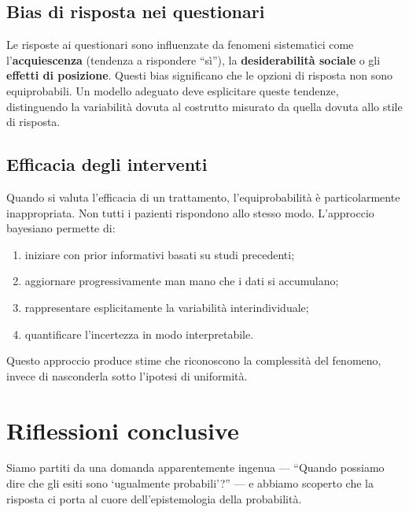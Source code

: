 \documentclass[
  italian,
  letterpaper,
  a4paper,
  11pt,
  open=any]{scrbook}
\providecommand{\tightlist}{%
  \setlength{\itemsep}{0pt}\setlength{\parskip}{0pt}}
\theoremstyle{plain}
\theoremstyle{definition}
\theoremstyle{definition}
\theoremstyle{remark}
\begin{document}
\subsection{Bias di risposta nei
questionari}\label{bias-di-risposta-nei-questionari}

Le risposte ai questionari sono influenzate da fenomeni sistematici come
l'\textbf{acquiescenza} (tendenza a rispondere ``sì''), la
\textbf{desiderabilità sociale} o gli \textbf{effetti di posizione}.
Questi bias significano che le opzioni di risposta non sono
equiprobabili. Un modello adeguato deve esplicitare queste tendenze,
distinguendo la variabilità dovuta al costrutto misurato da quella
dovuta allo stile di risposta.

\subsection{Efficacia degli
interventi}\label{efficacia-degli-interventi}

Quando si valuta l'efficacia di un trattamento, l'equiprobabilità è
particolarmente inappropriata. Non tutti i pazienti rispondono allo
stesso modo. L'approccio bayesiano permette di:

\begin{enumerate}
\def\labelenumi{\arabic{enumi}.}
\tightlist
\item
  iniziare con prior informativi basati su studi precedenti;
\item
  aggiornare progressivamente man mano che i dati si accumulano;
\item
  rappresentare esplicitamente la variabilità interindividuale;
\item
  quantificare l'incertezza in modo interpretabile.
\end{enumerate}

Questo approccio produce stime che riconoscono la complessità del
fenomeno, invece di nasconderla sotto l'ipotesi di uniformità.

\section*{Riflessioni conclusive}\label{riflessioni-conclusive-2}


Siamo partiti da una domanda apparentemente ingenua --- ``Quando
possiamo dire che gli esiti sono `ugualmente probabili'?'' --- e abbiamo
scoperto che la risposta ci porta al cuore dell'epistemologia della
probabilità.
\end{document}
